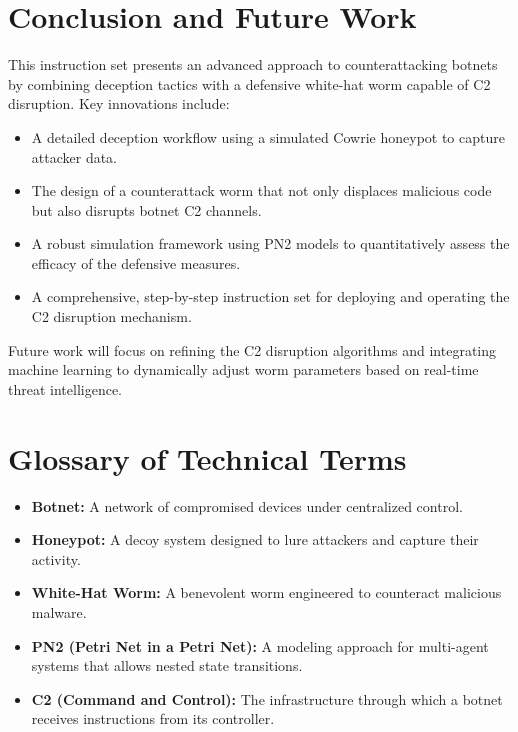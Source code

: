 \documentclass{article}
\begin{document}
\section{Conclusion and Future Work}
\noindent
This instruction set presents an advanced approach to counterattacking botnets by combining deception tactics with a defensive white-hat worm capable of C2 disruption. Key innovations include:
\begin{itemize}
    \item A detailed deception workflow using a simulated Cowrie honeypot to capture attacker data.
    \item The design of a counterattack worm that not only displaces malicious code but also disrupts botnet C2 channels.
    \item A robust simulation framework using PN2 models to quantitatively assess the efficacy of the defensive measures.
    \item A comprehensive, step-by-step instruction set for deploying and operating the C2 disruption mechanism.
\end{itemize}
Future work will focus on refining the C2 disruption algorithms and integrating machine learning to dynamically adjust worm parameters based on real-time threat intelligence.

\section{Glossary of Technical Terms}
\begin{itemize}
    \item \textbf{Botnet:} A network of compromised devices under centralized control.
    \item \textbf{Honeypot:} A decoy system designed to lure attackers and capture their activity.
    \item \textbf{White-Hat Worm:} A benevolent worm engineered to counteract malicious malware.
    \item \textbf{PN2 (Petri Net in a Petri Net):} A modeling approach for multi-agent systems that allows nested state transitions.
    \item \textbf{C2 (Command and Control):} The infrastructure through which a botnet receives instructions from its controller.
\end{itemize}


\nocite{*}
\printbibliography[heading=bibintoc,title={References}]
\end{document}
